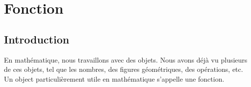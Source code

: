 \chapter{Fonction}

\section{Introduction}

En mathématique, nous travaillons avec des objets. Nous avons déjà vu plusieurs de ces objets, tel que les nombres, des figures géométriques, des opérations, etc. Un object particulièrement utile en mathématique s'appelle une fonction.


